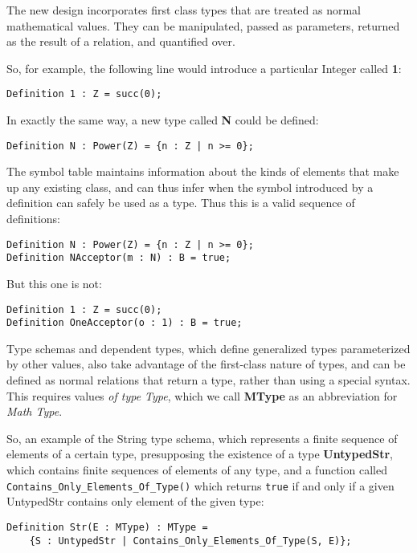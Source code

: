 The new design incorporates first class types that are treated as normal mathematical values.  They can be manipulated, passed as parameters, returned as the result of a relation, and quantified over.

So, for example, the following line would introduce a particular Integer called \textbf{1}:

\begin{lstlisting}
Definition 1 : Z = succ(0);
\end{lstlisting}

In exactly the same way, a new type called \textbf{N} could be defined:

\begin{lstlisting}
Definition N : Power(Z) = {n : Z | n >= 0};
\end{lstlisting}

The symbol table maintains information about the kinds of elements that make up any existing class, and can thus infer when the symbol introduced by a definition can safely be used as a type.  Thus this is a valid sequence of definitions:

\begin{lstlisting}
Definition N : Power(Z) = {n : Z | n >= 0};
Definition NAcceptor(m : N) : B = true;
\end{lstlisting}

But this one is not:

\begin{lstlisting}
Definition 1 : Z = succ(0);
Definition OneAcceptor(o : 1) : B = true;
\end{lstlisting}

Type schemas and dependent types, which define generalized types parameterized by other values, also take advantage of the first-class nature of types, and can be defined as normal relations that return a type, rather than using a special syntax.  This requires values \emph{of type Type}, which we call \textbf{MType} as an abbreviation for \emph{Math Type}.

So, an example of the String type schema, which represents a finite sequence of elements of a certain type, presupposing the existence of a type \textbf{UntypedStr}, which contains finite sequences of elements of any type, and a function called \texttt{Contains\_Only\_Elements\_Of\_Type()} which returns \texttt{true} if and only if a given UntypedStr contains only element of the given type:

\begin{lstlisting}
Definition Str(E : MType) : MType = 
	{S : UntypedStr | Contains_Only_Elements_Of_Type(S, E)};
\end{lstlisting}

